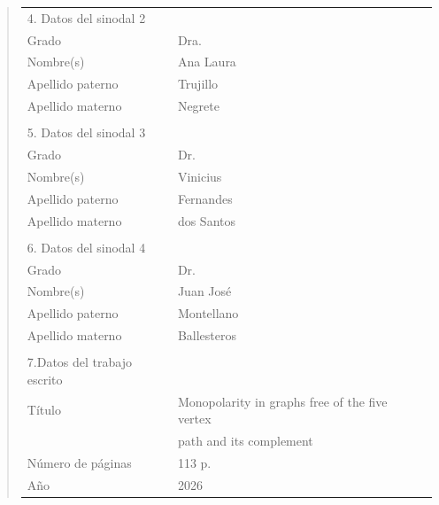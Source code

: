 {\begin{quote}
\begin{tabular}{lll}
4. Datos del sinodal 2      & {}                                            \\
Grado                       & Dra.                                          \\
Nombre(s)                   & Ana Laura                                     \\
Apellido paterno            & Trujillo                                      \\
Apellido materno            & Negrete                                       \\
{}                          & {}                                            \\
5. Datos del sinodal 3      & {}                                            \\
Grado                       & Dr.                                           \\
Nombre(s)                   & Vinicius                                      \\
Apellido paterno            & Fernandes                                     \\
Apellido materno            & dos Santos                                    \\
{}                          & {}                                            \\
6. Datos del sinodal 4      & {}                                            \\
Grado                       & Dr.                                           \\
Nombre(s)                   & Juan Jos\'e                                  \\
Apellido paterno            & Montellano                                    \\
Apellido materno            & Ballesteros                                   \\
{}                          & {}                                            \\
7.Datos del trabajo escrito & {}                                            \\
T\'itulo                    & Monopolarity in graphs free of the five vertex\\
{}                          & path and its complement                       \\
N\'umero de p\'aginas       & 113 p.                                        \\
A\~no                       & 2026                                          \\
\end{tabular}
\end{quote}
}
